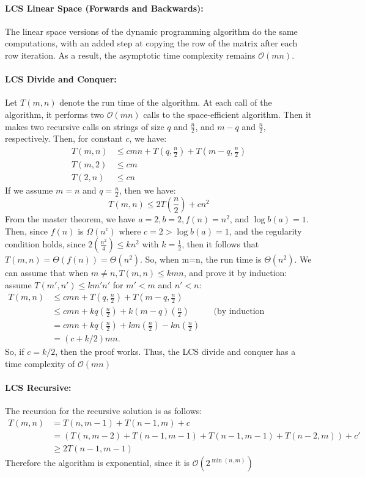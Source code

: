 \documentclass[a4paper,12pt]{article}
\newcommand{\bigO}{\mathcal{O}}
\begin{document}
			\paragraph{LCS Linear Space (Forwards and Backwards):} The linear space versions of the dynamic programming algorithm do the same computations, with an added step at copying the row of the matrix after each row iteration. As a result, the asymptotic time complexity remains $\bigO(mn)$.

			\paragraph{LCS Divide and Conquer:} Let $T(m,n)$ denote the run time of the algorithm. At each call of the algorithm, it performs two $\bigO(mn)$ calls to the space-efficient algorithm. Then it makes two recursive calls on strings of size $q$ and $\frac{n}{2}$, and $m - q$ and $\frac{n}{2}$, respectively. Then, for constant $c$, we have:
				\begin{align*}
					T(m,n) &\leq cmn + T(q,\frac{n}{2}) + T(m-q,\frac{n}{2}) \\
					T(m,2) &\leq cm \\
					T(2,n) &\leq cn
				\end{align*}
			If we assume $m = n$ and $q = \frac{n}{2}$, then we have:
				$$T(m,n) \leq 2T(\frac{n}{2}) + cn^2$$
			From the master theorem, we have $a = 2, b = 2, f(n) = n^2$, and $\log b(a) = 1$.
			Then, since $f(n)$ is $\Omega(n^c)$ where $c=2>\log b(a)=1$, and the regularity condition holds, since $2(\frac{n^2}{4}) \leq kn^2$ with $k = \frac{1}{2}$, then it follows that $T(m,n) = \Theta(f(n)) = \Theta(n^2)$.
			So, when m=n, the run time is $\Theta(n^2)$. We can assume that when $m \neq n, T(m,n) \leq kmn$, and prove it by induction:
			assume $T(m',n') \leq km'n'$ for $m'<m$ and $n'<n$:
			\begin{align*}
				T(m, n) &\leq cmn + T(q,\frac{n}{2}) + T(m-q,\frac{n}{2}) \\
					&\leq cmn + kq(\frac{n}{2}) + k(m-q)(\frac{n}{2}) &&\text{(by induction hypothesis)} \\
					&= cmn + kq(\frac{n}{2}) + km(\frac{n}{2}) - kn(\frac{n}{2}) \\
					&= (c+k/2)mn.
			\end{align*}
			So, if $c = k/2$, then the proof works. Thus, the LCS divide and conquer has a time complexity of $\bigO(mn)$

			\paragraph{LCS Recursive:} The recursion for the recursive solution is as follows:
			\begin{align*}
				T(m,n) &= T(n,m-1) + T(n-1,m) + c \\
					&= (T(n,m-2) + T(n-1,m-1) + T(n-1,m-1) + T(n-2,m)) + c' \\
					&\geq 2T(n-1,m-1)
			\end{align*}
			Therefore the algorithm is exponential, since it is $\bigO(2^{\min(n,m)})$
\end{document}
